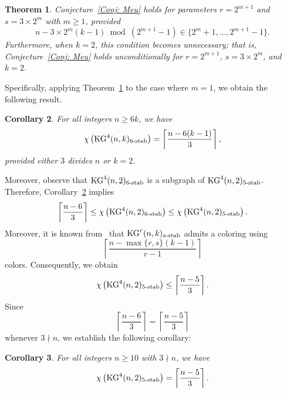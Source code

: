 \documentclass[preprint,12pt,3p]{elsarticle}
\newtheorem{theorem}{Theorem}
\newtheorem{corollary}[theorem]{Corollary}
\begin{document}
\begin{theorem}\label{Thm:main1}
    Conjecture~\ref{Conj: Meu} holds for parameters \( r = 2^{m+1} \) and \( s = 3 \times 2^{m} \) with \( m \geq 1 \), provided
    \[
        n - 3 \times 2^{m}(k-1) \bmod (2^{m+1} - 1) \in \{2^{m}+1, \dots, 2^{m+1}-1\}.
    \]
    Furthermore, when \( k = 2 \), this condition becomes unnecessary; that is, Conjecture~\ref{Conj: Meu} holds unconditionally for \( r = 2^{m+1} \), \( s = 3 \times 2^{m} \), and \( k = 2 \).
\end{theorem}

Specifically, applying Theorem~\ref{Thm:main1} to the case where $m=1$, we obtain the following result.

\begin{corollary}\label{corollary:1}
For all integers $n \geq 6k$, we have
\[
\chi\left(\mathrm{KG}^{4}(n,k)_{6\textup{-stab}}\right) = \left\lceil\frac{n - 6(k-1)}{3}\right\rceil,
\]
provided either $3$ divides $n$ or $k=2$.
\end{corollary}

Moreover, observe that $\mathrm{KG}^{4}(n,2)_{6\textup{-stab}}$ is a subgraph of $\mathrm{KG}^{4}(n,2)_{5\textup{-stab}}$. Therefore, Corollary~\ref{corollary:1} implies
\[
\left\lceil\frac{n-6}{3}\right\rceil \leq \chi\left(\mathrm{KG}^{4}(n,2)_{6\textup{-stab}}\right) \leq \chi\left(\mathrm{KG}^{4}(n,2)_{5\textup{-stab}}\right).
\]
Moreover, it is known from~\cite{Me11} that $\mathrm{KG}^r(n,k)_{s\textup{-stab}}$ admits a coloring using
\[
\left\lceil\frac{n - \max\{r,s\}(k-1)}{r-1}\right\rceil
\]
colors. Consequently, we obtain
\[
\chi\left(\mathrm{KG}^{4}(n,2)_{5\textup{-stab}}\right) \leq \left\lceil\frac{n-5}{3}\right\rceil.
\]
Since 
\[
\left\lceil\frac{n-6}{3}\right\rceil = \left\lceil\frac{n-5}{3}\right\rceil
\]
whenever $3 \nmid n$, we establish the following corollary:

\begin{corollary}\label{coro:2}
For all integers $n \geq 10$ with $3 \nmid n$, we have
\[
\chi\left(\mathrm{KG}^{4}(n,2)_{5\textup{-stab}}\right) = \left\lceil\frac{n-5}{3}\right\rceil.
\]
\end{corollary}
\end{document}
